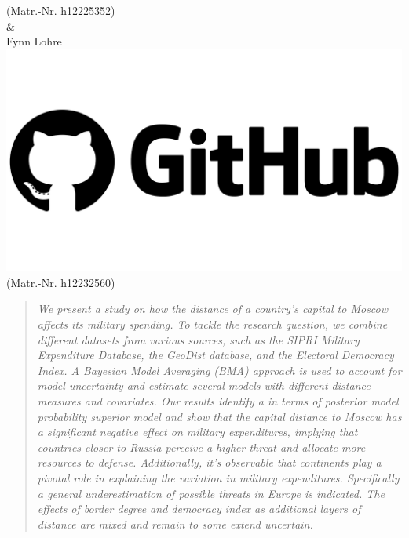 \documentclass[12pt,a4paper]{article}
\begin{document}
\begin{titlepage}
(Matr.-Nr. h12225352)\\ \vspace{3mm}
\& \\ \vspace{3mm}
{\Large Fynn Lohre \href{https://github.com/VARFynn}{\includegraphics[scale=0.01]{GitHub.png}}}\\
(Matr.-Nr. h12232560)\
\vfill

\thispagestyle{empty}
\pagebreak
\end{titlepage}
\thispagestyle{empty}
\begin{abstract}
\textit{We present a study on how the distance of a country’s capital to Moscow affects its military spending. To tackle the research question, we combine different datasets from various sources, such as the SIPRI Military Expenditure Database, the GeoDist database, and the Electoral Democracy Index. A Bayesian Model Averaging (BMA) approach is used to account for model uncertainty and estimate several models with different distance measures and covariates. Our results identify a in terms of posterior model probability superior model and show that the capital distance to Moscow has a significant negative effect on military expenditures, implying that countries closer to Russia perceive a higher threat and allocate more resources to defense. Additionally, it's observable that continents play a pivotal role in explaining the variation in military expenditures. Specifically a general underestimation of possible threats in Europe is indicated. The effects of border degree and democracy index as additional layers of distance are mixed and remain to some extend uncertain.} 
\end{abstract}
\clearpage
\thispagestyle{plain}
\tableofcontents
\pagebreak
{}
\end{document}

